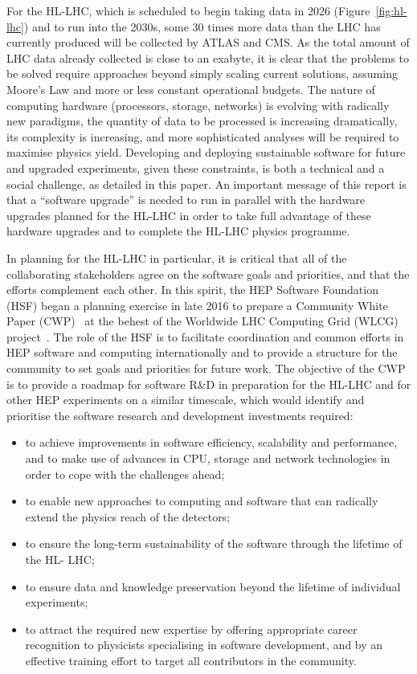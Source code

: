 \documentclass[12pt,a4paper]{article}
\begin{document}
For the HL-LHC, which is scheduled to begin taking data in 2026 (Figure~\ref{fig:hl-lhc}) and to run into the 2030s, some 30 times more data than
the LHC has currently produced will be collected by ATLAS and CMS. As
the total amount of LHC data already collected is close to an exabyte,
it is clear that the problems to be solved require approaches beyond
simply scaling current solutions, assuming Moore's Law and more or less
constant operational budgets. The nature of computing hardware
(processors, storage, networks) is evolving with radically new
paradigms, the quantity of data to be processed is increasing
dramatically, its complexity is increasing, and more sophisticated
analyses will be required to maximise physics yield. Developing and
deploying sustainable software for future and upgraded experiments,
given these constraints, is both a technical and a social challenge, as
detailed in this paper. An important message of this report is that a
``software upgrade'' is needed to run in parallel with the hardware
upgrades planned for the HL-LHC in order to take full advantage of these hardware upgrades and to complete the HL-LHC physics programme.

In planning for the HL-LHC in particular, it is critical that all of the
collaborating stakeholders agree on the software goals and priorities,
and that the efforts complement each other. In this spirit, the HEP
Software Foundation (HSF) began a planning exercise in late 2016 to
prepare a Community White Paper (CWP)~\cite{HSF2017} at the behest of the Worldwide LHC
Computing Grid (WLCG) project~\cite{WLCG2016}. The role of the HSF is to
facilitate coordination and common efforts in HEP software and computing
internationally and to provide a structure for the community to set
goals and priorities for future work. The objective of the CWP is to
provide a roadmap for software R\&D in preparation for the HL-LHC and
for other HEP experiments on a similar timescale, which would identify
and prioritise the software research and development investments
required:

\begin{itemize}
\item
  to achieve improvements in software efficiency, scalability and
  performance, and to make use of advances in CPU, storage and network
  technologies in order to cope with the challenges ahead;
\item
  to enable new approaches to computing and software that can radically
  extend the physics reach of the detectors;
\item
  to ensure the long-term sustainability of the software through the
  lifetime of the HL- LHC;
\item
  to ensure data and knowledge preservation beyond the lifetime of
  individual experiments;
\item
  to attract the required new expertise by offering appropriate career
  recognition to physicists specialising in software development, and by
  an effective training effort to target all contributors in the
  community.
\end{itemize}
\end{document}
